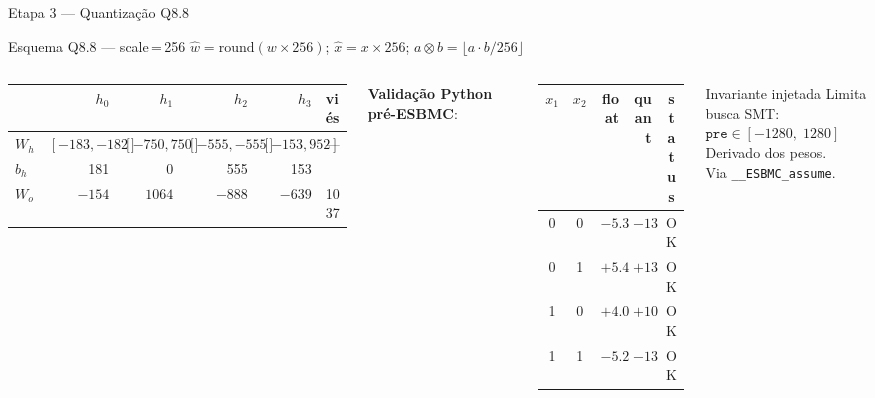 \documentclass[aspectratio=169]{beamer}
\begin{document}
\begin{frame}{Etapa 3 --- Quantização Q8.8}
  \begin{block}{Esquema Q8.8 --- scale\,=\,256}
    \small
    $\hat{w} = \mathrm{round}(w \times 256)$;\quad
    $\hat{x} = x \times 256$;\quad
    $a \otimes b = \lfloor a \cdot b / 256 \rfloor$
  \end{block}

  \vspace{0.2em}
  \begin{columns}
    \begin{center}
      \tiny
      \begin{tabular}{@{}lrrrrl@{}}
        \toprule
        & $h_0$ & $h_1$ & $h_2$ & $h_3$ & viés \\
        \midrule
        $W_h$ & $[-183,-182]$ & $[-750,750]$ & $[-555,-555]$ & $[-153,952]$ & --- \\
        $b_h$ & 181 & 0 & 555 & 153 & \\
        $W_o$ & $-154$ & $1064$ & $-888$ & $-639$ & 1037 \\
        \bottomrule
      \end{tabular}
    \end{center}
    \vspace{0.2em}
    \textbf{Validação Python pré-ESBMC}:
    \begin{center}
      \scriptsize
      \begin{tabular}{cc|rr|c}
        \toprule
        $x_1$ & $x_2$ & float & quant & status \\
        \midrule
        0 & 0 & $-5.39$ & $-1380$ & \textcolor{okgreen}{OK} \\
        0 & 1 & $+5.45$ & $+1395$ & \textcolor{okgreen}{OK} \\
        1 & 0 & $+4.05$ & $+1037$ & \textcolor{okgreen}{OK} \\
        1 & 1 & $-5.23$ & $-1340$ & \textcolor{okgreen}{OK} \\
        \bottomrule
      \end{tabular}
    \end{center}

    \begin{exampleblock}{Invariante injetada}
      \small
      Limita busca SMT:\\[0.2em]
      $\texttt{pre} \in [-1280,\; 1280]$\\[0.2em]
      \scriptsize Derivado dos pesos.\\
      Via \texttt{\_\_ESBMC\_assume}.
    \end{exampleblock}
  \end{columns}
\end{frame}
\end{document}
